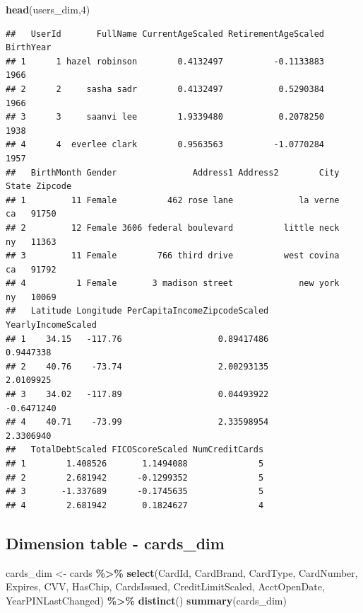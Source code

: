 \documentclass[
]{article}
\newenvironment{Shaded}{\begin{snugshade}}{\end{snugshade}}
\newcommand{\DecValTok}[1]{\textcolor[rgb]{0.00,0.00,0.81}{#1}}
\newcommand{\FunctionTok}[1]{\textcolor[rgb]{0.13,0.29,0.53}{\textbf{#1}}}
\newcommand{\NormalTok}[1]{#1}
\newcommand{\OtherTok}[1]{\textcolor[rgb]{0.56,0.35,0.01}{#1}}
\newcommand{\SpecialCharTok}[1]{\textcolor[rgb]{0.81,0.36,0.00}{\textbf{#1}}}
\begin{document}
\begin{Shaded}
\begin{Highlighting}[]
\FunctionTok{head}\NormalTok{(users\_dim,}\DecValTok{4}\NormalTok{)}
\end{Highlighting}
\end{Shaded}

\begin{verbatim}
##   UserId       FullName CurrentAgeScaled RetirementAgeScaled BirthYear
## 1      1 hazel robinson        0.4132497          -0.1133883      1966
## 2      2     sasha sadr        0.4132497           0.5290384      1966
## 3      3     saanvi lee        1.9339480           0.2078250      1938
## 4      4  everlee clark        0.9563563          -1.0770284      1957
##   BirthMonth Gender               Address1 Address2        City State Zipcode
## 1         11 Female          462 rose lane             la verne    ca   91750
## 2         12 Female 3606 federal boulevard          little neck    ny   11363
## 3         11 Female        766 third drive          west covina    ca   91792
## 4          1 Female       3 madison street             new york    ny   10069
##   Latitude Longitude PerCapitaIncomeZipcodeScaled YearlyIncomeScaled
## 1    34.15   -117.76                   0.89417486          0.9447338
## 2    40.76    -73.74                   2.00293135          2.0109925
## 3    34.02   -117.89                   0.04493922         -0.6471240
## 4    40.71    -73.99                   2.33598954          2.3306940
##   TotalDebtScaled FICOScoreScaled NumCreditCards
## 1        1.408526       1.1494088              5
## 2        2.681942      -0.1299352              5
## 3       -1.337689      -0.1745635              5
## 4        2.681942       0.1824627              4
\end{verbatim}

\subsection{Dimension table -
cards\_dim}\label{dimension-table---cards_dim}

\begin{Shaded}
\begin{Highlighting}[]
\NormalTok{cards\_dim }\OtherTok{\textless{}{-}}\NormalTok{ cards }\SpecialCharTok{\%\textgreater{}\%} \FunctionTok{select}\NormalTok{(CardId, CardBrand, CardType, CardNumber, Expires, }
\NormalTok{                              CVV, HasChip, CardsIssued, CreditLimitScaled, }
\NormalTok{                              AcctOpenDate, YearPINLastChanged) }\SpecialCharTok{\%\textgreater{}\%} \FunctionTok{distinct}\NormalTok{()}
\FunctionTok{summary}\NormalTok{(cards\_dim)}
\end{Highlighting}
\end{Shaded}
\end{document}

